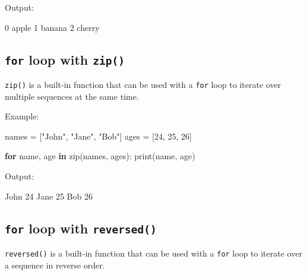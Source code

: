 \documentclass[
  paper=a4,
  ,captions=tableheading
]{scrartcl}
\newenvironment{Shaded}{}{}
\newcommand{\BuiltInTok}[1]{\textcolor[rgb]{0.00,0.50,0.00}{#1}}
\newcommand{\ControlFlowTok}[1]{\textcolor[rgb]{0.00,0.44,0.13}{\textbf{#1}}}
\newcommand{\DecValTok}[1]{\textcolor[rgb]{0.25,0.63,0.44}{#1}}
\newcommand{\ExtensionTok}[1]{#1}
\newcommand{\KeywordTok}[1]{\textcolor[rgb]{0.00,0.44,0.13}{\textbf{#1}}}
\newcommand{\NormalTok}[1]{#1}
\newcommand{\OperatorTok}[1]{\textcolor[rgb]{0.40,0.40,0.40}{#1}}
\newcommand{\StringTok}[1]{\textcolor[rgb]{0.25,0.44,0.63}{#1}}
\begin{document}
Output:

\begin{Shaded}
\begin{Highlighting}[]
\ExtensionTok{0}\NormalTok{ apple}
\ExtensionTok{1}\NormalTok{ banana}
\ExtensionTok{2}\NormalTok{ cherry}
\end{Highlighting}
\end{Shaded}

\hypertarget{for-loop-with-zip}{%
\subsection{\texorpdfstring{\texttt{for} loop with
\texttt{zip()}}{for loop with zip()}}\label{for-loop-with-zip}}

\texttt{zip()} is a built-in function that can be used with a
\texttt{for} loop to iterate over multiple sequences at the same time.

Example:

\begin{Shaded}
\begin{Highlighting}[]

\NormalTok{names }\OperatorTok{=}\NormalTok{ [}\StringTok{"John"}\NormalTok{, }\StringTok{"Jane"}\NormalTok{, }\StringTok{"Bob"}\NormalTok{]}
\NormalTok{ages }\OperatorTok{=}\NormalTok{ [}\DecValTok{24}\NormalTok{, }\DecValTok{25}\NormalTok{, }\DecValTok{26}\NormalTok{]}

\ControlFlowTok{for}\NormalTok{ name, age }\KeywordTok{in} \BuiltInTok{zip}\NormalTok{(names, ages):}
    \BuiltInTok{print}\NormalTok{(name, age)}
\end{Highlighting}
\end{Shaded}

Output:

\begin{Shaded}
\begin{Highlighting}[]
\ExtensionTok{John}\NormalTok{ 24}
\ExtensionTok{Jane}\NormalTok{ 25}
\ExtensionTok{Bob}\NormalTok{ 26}
\end{Highlighting}
\end{Shaded}

\hypertarget{for-loop-with-reversed}{%
\subsection{\texorpdfstring{\texttt{for} loop with
\texttt{reversed()}}{for loop with reversed()}}\label{for-loop-with-reversed}}

\texttt{reversed()} is a built-in function that can be used with a
\texttt{for} loop to iterate over a sequence in reverse order.
\end{document}
